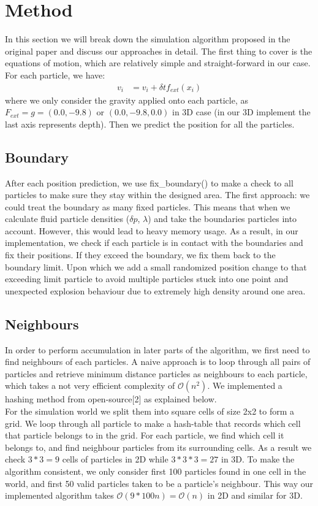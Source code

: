 \documentclass[sigconf]{acmart}
\begin{document}
\section{Method}
In this section we will break down the simulation algorithm proposed in the original paper and discuss our approaches in detail. The first thing to cover is the equations of motion, which are relatively simple and straight-forward in our case. For each particle, we have: 
\begin{align*}
    v_i &= v_i + \delta tf_{ext}(x_i)
\end{align*}
where we only consider the gravity applied onto each particle, as $F_{ext} = g = (0.0, -9.8)$ or $(0.0, -9.8, 0.0)$ in 3D case (in our 3D implement the last axis represents depth). Then we predict the position for all the particles.

\subsection{Boundary}
After each position prediction, we use fix\_boundary() to make a check to all particles to make sure they stay within the designed area. The first approach: we could treat the boundary as many fixed particles. This means that when we calculate fluid particle densities ($\delta p$, $\lambda$) and take the boundaries particles into account. However, this would lead to heavy memory usage. As a result, in our implementation, we check if each particle is in contact with the boundaries and fix their positions. If they exceed the boundary, we fix them back to the boundary limit. Upon which we add a small randomized position change to that exceeding limit particle to avoid multiple particles stuck into one point and unexpected explosion behaviour due to extremely high density around one area.

\subsection{Neighbours}
In order to perform accumulation in later parts of the algorithm, we first need to find neighbours of each particles. A naive approach is to loop through all pairs of particles and retrieve minimum distance particles as neighbours to each particle, which takes a not very efficient complexity of $\mathcal{O}(n^2)$. We implemented a hashing method from open-source[2] as explained below. \\
For the simulation world we split them into square cells of size 2x2 to form a grid. We loop through all particle to make a hash-table that records which cell that particle belongs to in the grid. For each particle, we find which cell it belongs to, and find neighbour particles from its surrounding cells. As a result we check $3*3=9$ cells of particles in 2D while $3*3*3=27$ in 3D. To make the algorithm consistent, we only consider first 100 particles found in one cell in the world, and first 50 valid particles taken to be a particle's neighbour. This way our implemented algorithm takes $\mathcal{O}(9*100n) = \mathcal{O}(n)$ in 2D and similar for 3D.
\end{document}

